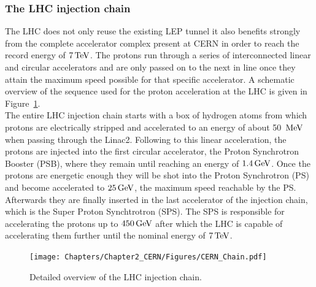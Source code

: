 \subsubsection{The LHC injection chain}
The LHC does not only reuse the existing LEP tunnel it also benefits strongly from the complete accelerator complex present at CERN in order to reach the record energy of $7 \, \mathrm{TeV}$. 
The protons run through a series of interconnected linear and circular accelerators and are only passed on to the next in line once they attain the maximum speed possible for that specific accelerator. A schematic overview of the sequence used for the proton acceleration at the LHC is given in Figure~\ref{fig::LHCChain}.\\
The entire LHC injection chain starts with a box of hydrogen atoms from which protons are electrically stripped and accelerated to an energy of about 50 $\, \mathrm{MeV}$ when passing through the Linac2.
Following to this linear acceleration, the protons are injected into the first circular accelerator, the Proton Synchrotron Booster (PSB), where they remain until reaching an energy of $1.4 \, \mathrm{GeV}$.
Once the protons are energetic enough they will be shot into the Proton Synchrotron (PS) and become accelerated to $25 \, \mathrm{GeV}$, the maximum speed reachable by the PS.
Afterwards they are finally inserted in the last accelerator of the injection chain, which is the Super Proton Synchtrotron (SPS).
The SPS is responsible for accelerating the protons up to $450 \, \mathrm{GeV}$ after which the LHC is capable of accelerating them further until the nominal energy of $7 \, \mathrm{TeV}$.
\begin{figure}[h!t]
 \centering
 \texttt{[image: Chapters/Chapter2\_CERN/Figures/CERN\_Chain.pdf]}
 \caption{Detailed overview of the LHC injection chain.} \label{fig::LHCChain}
\end{figure}

